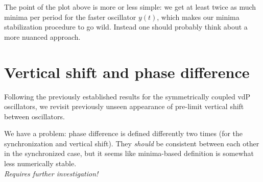 \documentclass{mynotes}
\begin{document}
The point of the plot above is more or less simple: we get at least twice as much minima per period for the faster oscillator \( y(t) \), which makes our minima stabilization procedure to go wild. Instead one should probably think about a more nuanced approach.     



\section{ Vertical shift and phase difference }

Following the previously established results for the symmetrically coupled vdP oscillators, we revisit previously unseen appearance of pre-limit vertical shift between oscillators.

\begin{alert}[Inconsistency!]
      We have a problem: phase difference is defined differently two times (for the synchronization and vertical shift). They \textit{should} be consistent between each other in the synchronized case, but it seems like minima-based definition is somewhat less numerically stable. 
      \\[5pt]

      \textit{\color{rwth-red}Requires further investigation!}
\end{alert}
\end{document}
